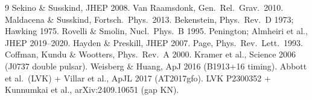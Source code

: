 \documentclass[11pt]{article}
\begin{document}
\begin{thebibliography}{9}
 Sekino \& Susskind, JHEP 2008.
 Van Raamsdonk, Gen.\ Rel.\ Grav.\ 2010.
 Maldacena \& Susskind, Fortsch.\ Phys.\ 2013.
 Bekenstein, Phys.\ Rev.\ D 1973; Hawking 1975.
 Rovelli \& Smolin, Nucl.\ Phys.\ B 1995.
 Penington; Almheiri et al., JHEP 2019--2020.
 Hayden \& Preskill, JHEP 2007.
 Page, Phys.\ Rev.\ Lett.\ 1993.
 Coffman, Kundu \& Wootters, Phys.\ Rev.\ A 2000.
 Kramer et al., Science 2006 (J0737 double pulsar).
 Weisberg \& Huang, ApJ 2016 (B1913+16 timing).
 Abbott et al.\ (LVK) + Villar et al., ApJL 2017 (AT2017gfo).
 LVK P2300352 + Kunnumkai et al., arXiv:2409.10651 (gap KN).
\end{thebibliography}
\end{document}
